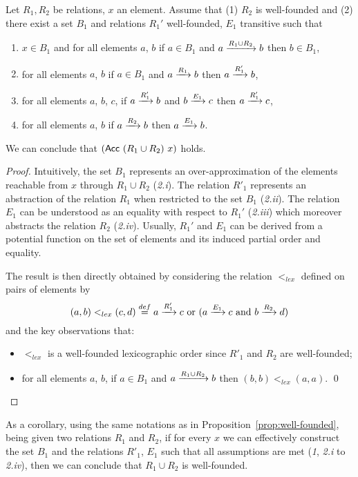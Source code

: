 \begin{proposition}\label{prop:well-founded}
  Let $R_1, R_2$ be relations, $x$ an element. Assume that (1)
  $R_2$ is well-founded and (2) there exist a set $B_1$ and relations
  $R_1'$ well-founded, $E_1$ transitive such that
\begin{enumerate}[label=(2.\roman*)]
\item $x \in B_1$ and for all elements $a$, $b$ if $a \in B_1$ and
  $a \xrightarrow{R_1 \cup R_2} b$ then $b \in B_1$,
\item for all elements $a$, $b$ if $a \in B_1$ and $a \xrightarrow{R_1}
  b$ then $a \xrightarrow{R_1'} b$,
\item for all elements $a$, $b$, $c$, if $a \xrightarrow{R'_1} b$ and $b
  \xrightarrow{E_1} c$ then $a \xrightarrow{R'_1} c$,
\item for all elements $a$, $b$ if $a \xrightarrow{R_2} b$ then
  $a \xrightarrow{E_1} b$.
\end{enumerate}
We can conclude that $(\mathsf{Acc}~ (R_1 \cup R_2)~ x)$ holds.
\end{proposition}
\begin{proof}
  Intuitively, the set $B_1$ represents an over-approximation of the
  elements reachable from $x$ through $R_1 \cup R_2$
  (\textit{2.i}). The relation $R'_1$ represents an abstraction of the
  relation $R_1$ when restricted to the set $B_1$ (\textit{2.ii}).
  The relation $E_1$ can be understood as an equality with respect to
  $R_1'$ (\textit{2.iii}) which moreover abstracts the relation $R_2$
  (\textit{2.iv}).  Usually, $R_1'$ and $E_1$ can be derived from a
  potential function on the set of elements and its induced partial
  order and equality.
  
  The result is then directly obtained by considering the relation
  $<_{lex}$ defined on pairs of elements by
  $$(a,b) <_{lex} (c,d) \stackrel{def}= a \xrightarrow{R'_1} c \mbox{ or } (a
  \xrightarrow{E_1} c \mbox{ and } b \xrightarrow{R_2} d)$$ and the key
  observations that:
\begin{itemize}
\item $<_{lex}$ is a well-founded lexicographic order since $R'_1$ and
  $R_2$ are well-founded;
\item for all elements $a$, $b$, if $a\in B_1$ and $a \xrightarrow{R_1 \cup
  R_2} b$ then $(b, b) <_{lex} (a, a)$. \qed
\end{itemize}
\end{proof}
As a corollary, using the same notations as in
Proposition~\ref{prop:well-founded}, being given two relations $R_1$
and $R_2$, if for every $x$ we can effectively construct the set $B_1$
and the relations $R'_1$, $E_1$ such that all assumptions are met
(\textit{1}, \textit{2.i} to \textit{2.iv}), then we can conclude that
$R_1 \cup R_2$ is well-founded.


